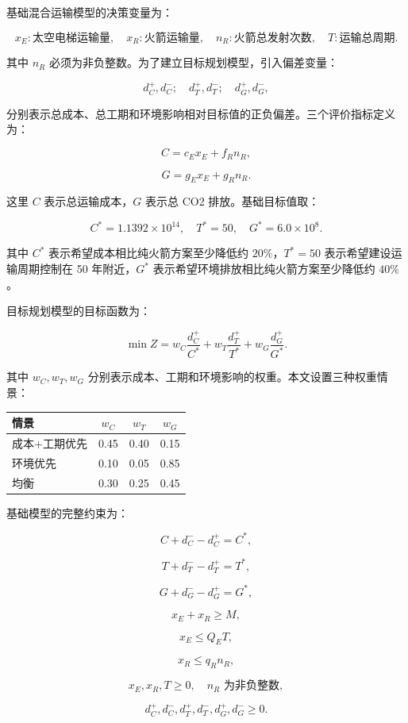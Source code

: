 \documentclass[12pt,a4paper,UTF8]{article}
\begin{document}
基础混合运输模型的决策变量为：

\[
x_E:\text{太空电梯运输量},\quad
x_R:\text{火箭运输量},\quad
n_R:\text{火箭总发射次数},\quad
T:\text{运输总周期}.
\]

其中 \(n_R\) 必须为非负整数。为了建立目标规划模型，引入偏差变量：

\[
d_C^+,d_C^-;\quad d_T^+,d_T^-;\quad d_G^+,d_G^-,
\]

分别表示总成本、总工期和环境影响相对目标值的正负偏差。三个评价指标定义为：

\[
C=c_Ex_E+f_Rn_R,
\]

\[
G=g_Ex_E+g_Rn_R.
\]

这里 \(C\) 表示总运输成本，\(G\) 表示总 CO2 排放。基础目标值取：

\[
C^*=1.1392\times10^{14},\quad T^*=50,\quad G^*=6.0\times10^8.
\]

其中 \(C^*\) 表示希望成本相比纯火箭方案至少降低约 \(20\%\)，\(T^*=50\) 表示希望建设运输周期控制在 50 年附近，\(G^*\) 表示希望环境排放相比纯火箭方案至少降低约 \(40\%\)。

目标规划模型的目标函数为：

\[
\min Z=
w_C\frac{d_C^+}{C^*}
+w_T\frac{d_T^+}{T^*}
+w_G\frac{d_G^+}{G^*}.
\]

其中 \(w_C,w_T,w_G\) 分别表示成本、工期和环境影响的权重。本文设置三种权重情景：

\begin{center}
\renewcommand{\arraystretch}{1.25}
\begin{tabular}{lccc}
\toprule
情景 & \(w_C\) & \(w_T\) & \(w_G\) \\
\midrule
成本+工期优先 & 0.45 & 0.40 & 0.15 \\
环境优先 & 0.10 & 0.05 & 0.85 \\
均衡 & 0.30 & 0.25 & 0.45 \\
\bottomrule
\end{tabular}
\end{center}

基础模型的完整约束为：

\[
C+d_C^- - d_C^+ = C^*,
\]

\[
T+d_T^- - d_T^+ = T^*,
\]

\[
G+d_G^- - d_G^+ = G^*,
\]

\[
x_E+x_R\ge M,
\]

\[
x_E\le Q_ET,
\]

\[
x_R\le q_Rn_R,
\]

\[
x_E,x_R,T\ge0,\quad n_R\text{ 为非负整数},
\]

\[
d_C^+,d_C^-,d_T^+,d_T^-,d_G^+,d_G^-\ge0.
\]
\end{document}
